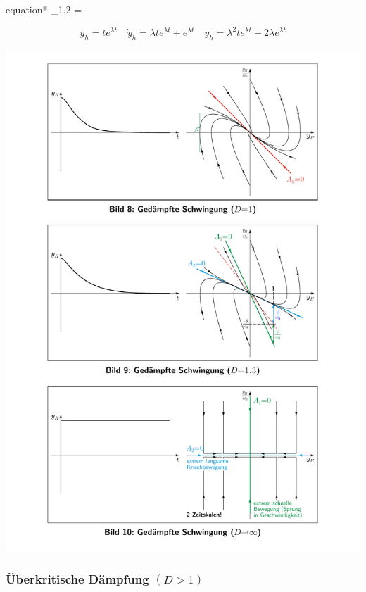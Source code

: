 \documentclass[9pt,fleqn,ngerman,article]{memoir}
\begin{document}
\begin{multicols*}{3}
					\begin{empheq}[box=\shadowbox*]{equation*}
						\lambda_{1,2} = - \delta
					\end{empheq}
					
					\[
						y_h = t e^{\lambda t}
						\quad
						\dot{y}_h = \lambda t e^{\lambda t} + e^{\lambda t}
						\quad
						\ddot{y}_h = \lambda^2 t e^{\lambda t} + 2 \lambda e^{\lambda t}
					\]
					
					\begin{center}
						\includegraphics[width=\columnwidth]{grafiken/daempfung_d_1}
					\end{center}
				
				\subsubsection{Überkritische Dämpfung $(D > 1)$} %
					

\end{multicols*}
\end{document}
